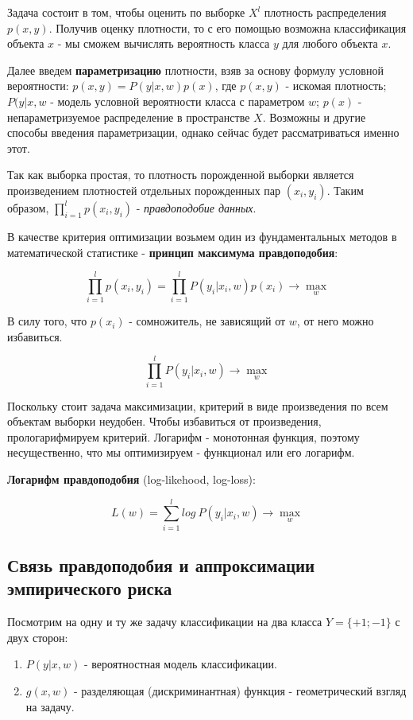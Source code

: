 Задача состоит в том, чтобы оценить по выборке \(X^{l}\) плотность распределения \(p(x,y)\). Получив оценку плотности, то с его помощью возможна классификация объекта \(x\) - мы сможем вычислять вероятность класса \(y\) для любого объекта \(x\). 

Далее введем \textbf{параметризацию} плотности, взяв за основу формулу условной вероятности: \(p(x,y) = P(y | x,w)p(x)\), где \(p(x,y)\) - искомая плотность; \(P(y|x,w\) - модель условной вероятности класса с параметром \(w\); \(p(x)\) - непараметризуемое распределение в пространстве \(X\). Возможны и другие способы введения параметризации, однако сейчас будет рассматриваться именно этот.

Так как выборка простая, то плотность порожденной выборки является произведением плотностей отдельных порожденных пар \((x_{i}, y_{i})\). Таким образом, \(\prod_{i=1}^{l}{p(x_{i},y_{i})}\) - \textit{правдоподобие данных}.

В качестве критерия оптимизации возьмем один из фундаментальных методов в математической статистике - \textbf{принцип максимума правдоподобия}:

\[
\prod_{i=1}^{l}{p(x_{i},y_{i})} = \prod_{i=1}^{l}{P(y_{i}|x_{i},w)p(x_{i})} \xrightarrow{} \max_{w} 
\]

В силу того, что \(p(x_{i})\) - сомножитель, не зависящий от \(w\), от него можно избавиться.

\[
\prod_{i=1}^{l}{P(y_{i}|x_{i},w)} \xrightarrow{} \max_{w} 
\]

Поскольку стоит задача максимизации, критерий в виде произведения по всем объектам выборки неудобен. Чтобы избавиться от произведения, прологарифмируем критерий. Логарифм - монотонная функция, поэтому несущественно, что мы оптимизируем - функционал или его логарифм.

\textbf{Логарифм правдоподобия} (log-likehood, log-loss):

\[
L(w) = \sum_{i=1}^{l}{log \ P(y_{i}|x_{i},w)} \xrightarrow{} \max_{w}
\]

\subsection{Связь правдоподобия и аппроксимации эмпирического риска}

Посмотрим на одну и ту же задачу классификации на два класса \(Y = \{+1; -1\}\) с двух сторон:
\begin{enumerate}
    \item \(P(y|x,w)\) - вероятностная модель классификации. 
    \item \(g(x,w)\) - разделяющая (дискриминантная) функция - геометрический взгляд на задачу.
\end{enumerate}

